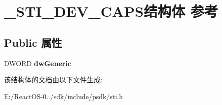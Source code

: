 \hypertarget{struct___s_t_i___d_e_v___c_a_p_s}{}\section{\+\_\+\+S\+T\+I\+\_\+\+D\+E\+V\+\_\+\+C\+A\+P\+S结构体 参考}
\label{struct___s_t_i___d_e_v___c_a_p_s}
\subsection*{Public 属性}
\begin{DoxyCompactItemize}
\item 
\mbox{\label{struct___s_t_i___d_e_v___c_a_p_s_a6af635298472ebf3fbf01add1337dd33}} 
D\+W\+O\+RD {\bfseries dw\+Generic}
\end{DoxyCompactItemize}


该结构体的文档由以下文件生成\+:\begin{DoxyCompactItemize}
\item 
E\+:/\+React\+O\+S-\/0../sdk/include/psdk/sti.\+h\end{DoxyCompactItemize}
